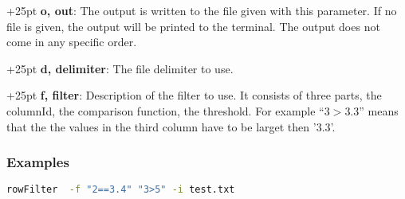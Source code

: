 \documentclass[a4paper,10pt,parskip=half]{scrreprt}
\begin{document}
\hangindent+25pt 
\textbf{o, out}: The output is written to the file given with this parameter. If
no file is given, the output will be printed to the terminal. The output does
not come in any specific order.

\hangindent+25pt 
\textbf{d, delimiter}: The file delimiter to use. 

\hangindent+25pt 
\textbf{f, filter}: Description of the filter to use. It consists of three parts, the columnId, the comparison function, the threshold. For example ``3$>$3.3'' means that the the values in the third column have to be larget then '3.3'.



\subsubsection*{Examples}
\begin{lstlisting}[language=bash,frame=none,morekeywords={PROMPT}]
 rowFilter  -f "2==3.4" "3>5" -i test.txt
\end{lstlisting}
\end{document}
